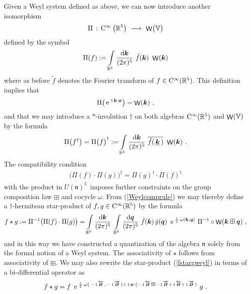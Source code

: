 \documentclass[11pt,a4paper]{article}
\DeclareMathOperator{\weyl}{{\sf W}}                   %
\newcommand{\comp}{\boxplus}                            %
\def\d{\partial}
\newcommand{\1}{\mathbb{1}}
\newcommand{\mbf}[1]{{\boldsymbol {#1} }}
\def\ii{{\,{\rm i}\,}}
\def\dd{{\rm d}}
\def\CC{{\rm C}}
\def\mx{{\mbf x}}
\def\mk{{\mbf k}}
\def\mq{{\mbf q}}
\def\mfn{{\mathfrak n}}
\def\mbbV{{\mathbb V}}
\newcommand{\complex}{{\mathbb C}} %
\newcommand{\real}{{\mathbb R}} %
\def\e{{\,\rm e}\,}
\def\d{\partial}
\newcommand{\beq}{\begin{eqnarray}}
\newcommand{\eeq}{\end{eqnarray}}
\begin{document}
Given a Weyl system defined as above, we can now introduce
another isomorphism
\beq
\Pi\,:\,\CC^\infty\left(\real^5\right)~\longrightarrow~
\weyl\bigl(\mathbb{V}\bigr)
\label{Omegaquantmap}\eeq
defined by the symbol
\beq
\Pi(f):=\int\limits_{\real^5}\frac{\dd\mk}{(2\pi)^5}~
\tilde{f}(\mk)~\weyl(\mk)
\label{Omegafdef}\eeq
where as before $\tilde f$ denotes the Fourier transform of
$f\in\CC^\infty(\real^5)$. This definition implies that
\beq
\Pi\bigl(\e^{\ii\mk\cdot\mx}\bigr)=\weyl(\mk) \ ,
\label{weylmkDelta}\eeq
and that we may introduce a $*$-involution $\dag$ on both algebras
$\CC^\infty(\real^5)$ and $\weyl(\mbbV)$ by the formula
\beq
\Pi\bigl(f^\dag\bigr)=\Pi\bigl(f\bigr)^\dag:=
\int\limits_{\real^5}\frac{\dd\mk}{(2\pi)^5}~\overline{
\tilde f(\,\underline{\mk}\,)}~\weyl(\mk) \ .
\label{involdef}\eeq
The compatibility condition
\beq
\bigl(\Pi(f)\cdot\Pi(g)\bigr)^\dag=\Pi(g)^\dag\cdot
\Pi(f)^\dag
\label{compconddag}\eeq
with the product in $\overline{U(\mfn)^\complex}$ imposes further
constraints on the group composition law $\comp$ and cocycle $\omega$. From
(\ref{Weylcomprule}) we may thereby define a $\dag$-hermitean
star-product of $f,g\in\CC^\infty(\real^5)$ by the formula
\beq
f\star g:=\Pi^{-1}\bigl(\Pi(f)\cdot\Pi(g)\bigr)
=\int\limits_{\real^5}\frac{\dd\mk}{(2\pi)^5}~
\int\limits_{\real^5}\frac{\dd\mq}{(2\pi)^5}~\tilde f(\mk)\,
\tilde g(\mq)~\e^{\frac\ii2\,\omega(\mk,\mq)}~
\Pi^{-1}\circ\weyl(\mk\comp\mq) \ ,
\label{fstargweyl}\eeq
and in this way we have constructed a quantization of the
algebra $\mfn$ solely from the formal notion of a Weyl system.
The associativity of $\star$ follows from associativity of
$\comp$. We may also rewrite the star-product (\ref{fstargweyl}) in
terms of a bi-differential operator as
\beq
f\star g=f~\e^{\frac\ii2\,\omega(\,-\ii\overleftarrow{\mbf\d}\,,\,
-\ii\overrightarrow{\mbf\d}\,)+\ii\mx\cdot(-\ii\overleftarrow{\mbf\d}\,\comp
-\ii\overrightarrow{\mbf\d}+\ii\overleftarrow{\mbf\d}+\ii
\overrightarrow{\mbf\d}\,)}~g \ .
\label{bidiffweyl}\eeq
\end{document}
